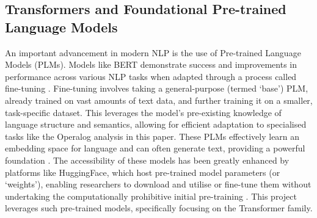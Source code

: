 \documentclass[10pt,oneside]{report}
\renewcommand{\citet}[1]{\citeauthor{#1}, \citeyear{#1}}
\begin{document}
%

\subsection{Transformers and Foundational Pre-trained Language Models}\label{sec:BERT} %

An important advancement in modern NLP is the use of Pre-trained Language Models (PLMs). Models like BERT \cite{devlin2019bert} demonstrate success and improvements in performance across various NLP tasks when adapted through a process called fine-tuning \cite{edunov2019pre, min2023recent}. Fine-tuning involves taking a general-purpose (termed `base') PLM, already trained on vast amounts of text data, and further training it on a smaller, task-specific dataset. This leverages the model's pre-existing knowledge of language structure and semantics, allowing for efficient adaptation to specialised tasks like the Operalog analysis in this paper. These PLMs effectively learn an embedding space for language and can often generate text, providing a powerful foundation \cite{devlin2019bert}. The accessibility of these models has been greatly enhanced by platforms like HuggingFace, which host pre-trained model parameters (or `weights'), enabling researchers to download and utilise or fine-tune them without undertaking the computationally prohibitive initial pre-training \cite{wolf2019huggingface}. This project leverages such pre-trained models, specifically focusing on the Transformer family.
\end{document}
